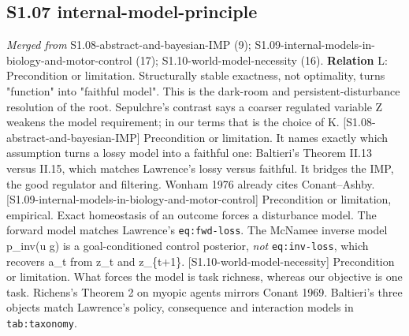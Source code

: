 \documentclass[10pt]{article}
\begin{document}
\subsection{S1.07 internal-model-principle}\label{node:S1-S1-07-internal-model-principle}
\textit{Merged from} S1.08-abstract-and-bayesian-IMP (9); S1.09-internal-models-in-biology-and-motor-control (17); S1.10-world-model-necessity (16). \textbf{Relation} \textsf{L}: Precondition or limitation. Structurally stable exactness, not optimality, turns "function" into "faithful model". This is the dark-room and persistent-disturbance resolution of the root. Sepulchre's contrast says a coarser regulated variable Z weakens the model requirement; in our terms that is the choice of K. [S1.08-abstract-and-bayesian-IMP] Precondition or limitation. It names exactly which assumption turns a lossy model into a faithful one: Baltieri's Theorem II.13 versus II.15, which matches Lawrence's lossy versus faithful. It bridges the IMP, the good regulator and filtering. Wonham 1976 already cites Conant--Ashby. [S1.09-internal-models-in-biology-and-motor-control] Precondition or limitation, empirical. Exact homeostasis of an outcome forces a disturbance model. The forward model matches Lawrence's \texttt{eq:fwd-loss}. The McNamee inverse model p\_inv(u \textbar{} g) is a goal-conditioned control posterior, \emph{not} \texttt{eq:inv-loss}, which recovers a\_t from z\_t and z\_\{t+1\}. [S1.10-world-model-necessity] Precondition or limitation. What forces the model is task richness, whereas our objective is one task. Richens's Theorem 2 on myopic agents mirrors Conant 1969. Baltieri's three objects match Lawrence's policy, consequence and interaction models in \texttt{tab:taxonomy}.
\end{document}
